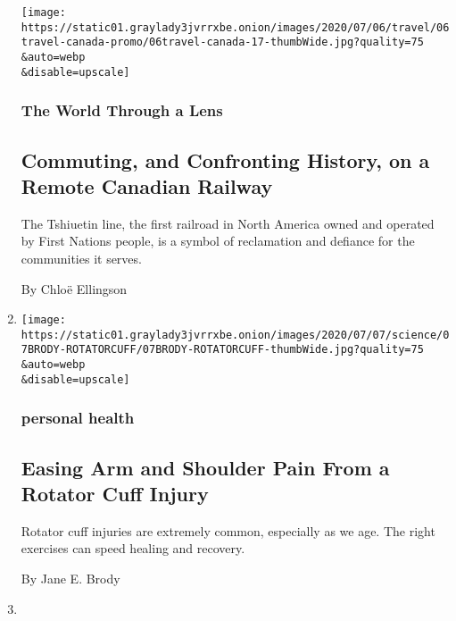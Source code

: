 \begin{enumerate}
  \texttt{[image: https://static01.graylady3jvrrxbe.onion/images/2020/07/06/travel/06travel-canada-promo/06travel-canada-17-thumbWide.jpg?quality=75\\\&auto=webp\\\&disable=upscale]}

  \hypertarget{the-world-through-a-lens-1}{%
  \subsubsection{The World Through a
  Lens}\label{the-world-through-a-lens-1}}

  \hypertarget{commuting-and-confronting-history-on-a-remote-canadian-railway}{%
  \subsection{Commuting, and Confronting History, on a Remote Canadian
  Railway}\label{commuting-and-confronting-history-on-a-remote-canadian-railway}}

  The Tshiuetin line, the first railroad in North America owned and
  operated by First Nations people, is a symbol of reclamation and
  defiance for the communities it serves.

  By Chloë Ellingson
\item
  \href{/2020/07/06/well/move/arm-shoulder-pain-rotator-cuff-injury.html}{}

  \texttt{[image: https://static01.graylady3jvrrxbe.onion/images/2020/07/07/science/07BRODY-ROTATORCUFF/07BRODY-ROTATORCUFF-thumbWide.jpg?quality=75\\\&auto=webp\\\&disable=upscale]}

  \hypertarget{personal-health}{%
  \subsubsection{personal health}\label{personal-health}}

  \hypertarget{easing-arm-and-shoulder-pain-from-a-rotator-cuff-injury}{%
  \subsection{Easing Arm and Shoulder Pain From a Rotator Cuff
  Injury}\label{easing-arm-and-shoulder-pain-from-a-rotator-cuff-injury}}

  Rotator cuff injuries are extremely common, especially as we age. The
  right exercises can speed healing and recovery.

  By Jane E. Brody
\item
  \href{/2020/07/02/well/move/the-well-summer-workout-challenge.html}{}


\end{enumerate}
